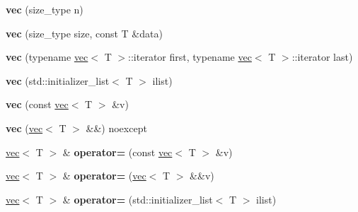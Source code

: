 \begin{DoxyCompactItemize}
\item 
\mbox{\label{classsc2d_1_1vec_a0ff942dd9738e936122675eebf2ba719}} 
{\bfseries vec} (size\+\_\+type n)
\item 
\mbox{\label{classsc2d_1_1vec_ab7c841a3ee71ad3f9a15d703328daa43}} 
{\bfseries vec} (size\+\_\+type size, const T \&data)
\item 
\mbox{\label{classsc2d_1_1vec_a0009d1ca75442e5ddf6385fac67222d0}} 
{\bfseries vec} (typename \hyperlink{classsc2d_1_1vec}{vec}$<$ T $>$\+::iterator first, typename \hyperlink{classsc2d_1_1vec}{vec}$<$ T $>$\+::iterator last)
\item 
\mbox{\label{classsc2d_1_1vec_a3b9057afc21027aaf672a58a6c8312e4}} 
{\bfseries vec} (std\+::initializer\+\_\+list$<$ T $>$ ilist)
\item 
\mbox{\label{classsc2d_1_1vec_accf4a70d3f70ad041ebca4bf1b26b06a}} 
{\bfseries vec} (const \hyperlink{classsc2d_1_1vec}{vec}$<$ T $>$ \&v)
\item 
\mbox{\label{classsc2d_1_1vec_ab588eeb4161c7acb6108bbf893ec01f8}} 
{\bfseries vec} (\hyperlink{classsc2d_1_1vec}{vec}$<$ T $>$ \&\&) noexcept
\item 
\mbox{\label{classsc2d_1_1vec_a4bfee2e7b5eed4915bc47847aa65d1d7}} 
\hyperlink{classsc2d_1_1vec}{vec}$<$ T $>$ \& {\bfseries operator=} (const \hyperlink{classsc2d_1_1vec}{vec}$<$ T $>$ \&v)
\item 
\mbox{\label{classsc2d_1_1vec_a08491e66fc10434252723533c4e8774c}} 
\hyperlink{classsc2d_1_1vec}{vec}$<$ T $>$ \& {\bfseries operator=} (\hyperlink{classsc2d_1_1vec}{vec}$<$ T $>$ \&\&v)
\item 
\mbox{\label{classsc2d_1_1vec_ac5a80b4e4bd064b874be5e13f589c4c9}} 
\hyperlink{classsc2d_1_1vec}{vec}$<$ T $>$ \& {\bfseries operator=} (std\+::initializer\+\_\+list$<$ T $>$ ilist)
\item 
\mbox{\label{classsc2d_1_1vec_a7994842384d31bbfd3f616c66cf8e533}} 

\end{DoxyCompactItemize}
